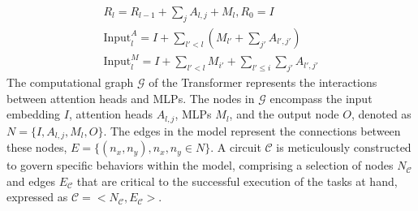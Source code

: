 \begin{align*}
R_l = R_{l-1}+\sum_j A_{l,j}+M_l, R_{0} = I \\
\text{Input}^A_l = I+\sum_{l'<l} \left(M_{l'}+\sum_{j'} A_{l',j'}\right) \\
\text{Input}^M_l=I+\sum_{l'<l}M_{i'} + \sum_{l'\leq i}\sum_{j'}A_{l',j'}
\end{align*}
The computational graph $\mathcal{G}$ of the Transformer represents the interactions between attention heads and MLPs. 
The nodes in $\mathcal{G}$ encompass the input embedding $I$, attention heads $A_{l,j}$, MLPs $M_l$, and the output node $O$, denoted as $N = \{I, A_{l,j}, M_{l}, O\}$.
The edges in the model represent the connections between these nodes, $E = \{(n_{x}, n_{y}), n_{x}, n_{y} \in N\}$.
A circuit $\mathcal{C}$ is meticulously constructed to govern specific behaviors within the model, comprising a selection of nodes $N_{\mathcal{C}}$ and edges $E_{\mathcal{C}}$ that are critical to the successful execution of the tasks at hand, expressed as $\mathcal{C} = <N_{\mathcal{C}}, E_{\mathcal{C}}>$.
